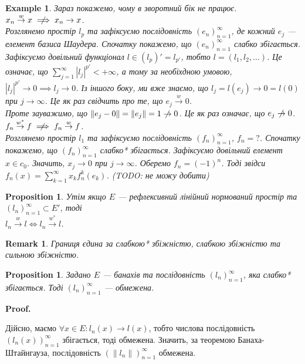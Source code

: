 \documentclass[a4paper, 10pt]{article}
\makeatletter
\theoremstyle{theoremdd}
\theoremstyle{theoremdd}
\theoremstyle{theoremdd}
\theoremstyle{theoremdd}
\newtheorem{example}[theorem]{Example}
\theoremstyle{theoremdd}
\newtheorem{proposition}[theorem]{Proposition}
\theoremstyle{theoremdd}
\newtheorem{remark}[theorem]{Remark}
\theoremstyle{theoremdd}
\theoremstyle{theoremdd}
\newcommand{\toweak}{\overset{w}{\to}}
\newcommand{\toweakstar}{\overset{w^*}{\to}}
\renewenvironment{proof}[1][Proof.\\]{\par
\pushQED{\hfill \qed}%
\normalfont \topsep6\p@\@plus6\p@\relax
\trivlist
\item\relax
{\bfseries
#1\@addpunct{.}}\hspace\labelsep\ignorespaces
}{%
\popQED\endtrivlist\@endpefalse
}
\makeatother
\begin{document}
\begin{example}
Зараз покажемо, чому в зворотний бік не працює.
\bigskip \\
$x_n \toweak x \centernot\implies x_n \to x$.\\
Розглянемо простір $l_p$ та зафіксуємо послідовність $(e_n)_{n=1}^\infty$, де кожний $e_j$ --- елемент базиса Шаудера. Спочатку покажемо, що $(e_n)_{n=1}^\infty$ слабко збігається. Зафіксуємо довільний функціонал $l \in (l_p)' = l_{p'}$, тобто $l = (l_1,l_2,\dots)$. Це означає, що $\displaystyle\sum_{j=1}^\infty |l_j|^{p'} < + \infty$, а тому за необіхдною умовою, $|l_j|^{p'} \to 0 \implies l_j \to 0$. Із іншого боку, ми вже знаємо, що $l_j = l(e_j) \to 0 = l(0)$ при $j \to \infty$. Це як раз свідчить про те, що $e_j \toweak 0$.\\
Проте зауважимо, що $\|e_j - 0 \| = \|e_j\| = 1 \centernot\to 0$. Це як раз означає, що $e_j \centernot\to 0$.
\bigskip \\
$f_n \toweakstar f \centernot\implies f_n \toweak f$.\\
Розглянемо простір $l_1$ та зафіксуємо послідовність $(f_n)_{n=1}^\infty$, $f_n = ?$. Спочатку покажемо, що $(f_n)_{n=1}^\infty$ слабко* збігається. Зафіксуємо довільний елемент $x \in c_0$. Значить, $x_j \to 0$ при $j \to \infty$. Оберемо $f_n = (-1)^n$. Тоді звідси $f_n(x) = \displaystyle\sum_{k=1}^\infty x_k f_n^k(e_k)$. (TODO: не можу добити)
\end{example}

\begin{proposition}
Утім якщо $E$ --- рефлексивний лінійний нормований простір та $(l_n)_{n=1}^\infty \subset E'$, тоді\\
$l_n \toweak l \iff l_n \toweakstar l$.
\end{proposition}

\begin{remark}
Границя єдина за слабкою* збіжністю, слабкою збіжністю та сильною збіжністю.
\end{remark}

\begin{proposition}
Задано $E$ --- банахів та послідовність $(l_n)_{n=1}^\infty$, яка слабко* збігається. Тоді $(l_n)_{n=1}^\infty$ --- обмежена.
\end{proposition}

\begin{proof}
Дійсно, маємо $\forall x \in E: l_n(x) \to l(x)$, тобто числова послідовність $(l_n(x))_{n=1}^\infty$ збігається, тоді обмежена. Значить, за теоремою Банаха-Штайнгауза, послідовність $(\|l_n\|)_{n=1}^\infty$ обмежена.
\end{proof}
\end{document}
